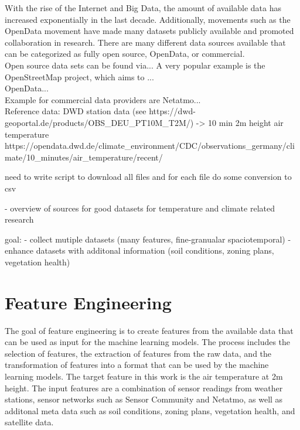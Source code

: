 With the rise of the Internet and Big Data, the amount of available data has increased exponentially in the last decade. Additionally, movements such as the OpenData movement have made many datasets publicly available and promoted collaboration in research. There are many different data sources available that can be categorized as fully open source, OpenData, or commercial.\\
Open source data sets can be found via... A very popular example is the OpenStreetMap project, which aims to ...\\
OpenData...\\
Example for commercial data providers are Netatmo...\\

Reference data: DWD station data (see https://dwd-geoportal.de/products/OBS\_DEU\_PT10M\_T2M/) -> 10 min 2m height air temperature
https://opendata.dwd.de/climate\_environment/CDC/observations\_germany/climate/10\_minutes/air\_temperature/recent/

need to write script to download all files and for each file do some conversion to csv

- overview of sources for good datasets for temperature and climate related research

goal:
- collect mutiple datasets (many features, fine-granualar spaciotemporal)
- enhance datasets with additonal information (soil conditions, zoning plans, vegetation health)


\section{Feature Engineering}

The goal of feature engineering is to create features from the available data that can be used as input for the machine learning models. The process includes the selection of features, the extraction of features from the raw data, and the transformation of features into a format that can be used by the machine learning models.
The target feature in this work is the air temperature at 2m height. The input features are a combination of sensor readings from weather stations, sensor networks such as Sensor Community and Netatmo, as well as additonal meta data such as soil conditions, zoning plans, vegetation health, and satellite data.\\

